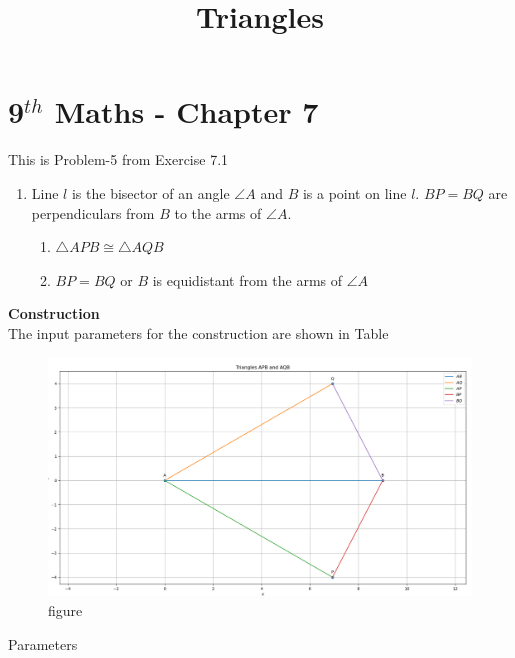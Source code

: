 \documentclass[10pt]{article}
\begin{document}
\title{\textbf{Triangles}}
\maketitle

\section*{9$^{th}$ Maths - Chapter 7}
This is Problem-5 from Exercise 7.1

\begin{enumerate}
\item Line $l$ is the bisector of an angle $\angle{A}$ and $B$ is a point on line $l$. $BP = BQ$ are perpendiculars from $B$ to the arms of $\angle{A}$. 
\begin{enumerate}
\item $\triangle{APB} \cong \triangle{AQB}$
\item $BP = BQ$ or $B$ is equidistant from the arms of $\angle{A}$
\end{enumerate}
\end{enumerate}

\textbf{Construction}\\
The input parameters for the construction are shown in Table 
\begin{figure}[H]
    \begin{center}
     \includegraphics[width=\columnwidth]{figs/tri.png}
    \caption{figure}
    \label{fig1}   
    \end{center}
\end{figure}



\begin{table}[h]
	  \centering
	  
	  \caption{Parameters}
	  \label{Table}
\end{table}
\end{document}
